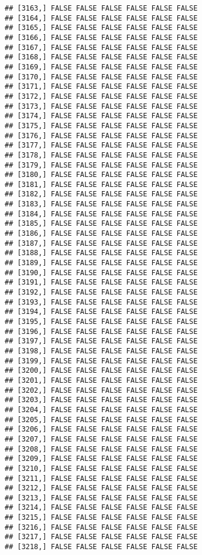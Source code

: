\documentclass[
]{article}
\begin{document}
\begin{verbatim}
## [3163,] FALSE FALSE FALSE FALSE FALSE FALSE
## [3164,] FALSE FALSE FALSE FALSE FALSE FALSE
## [3165,] FALSE FALSE FALSE FALSE FALSE FALSE
## [3166,] FALSE FALSE FALSE FALSE FALSE FALSE
## [3167,] FALSE FALSE FALSE FALSE FALSE FALSE
## [3168,] FALSE FALSE FALSE FALSE FALSE FALSE
## [3169,] FALSE FALSE FALSE FALSE FALSE FALSE
## [3170,] FALSE FALSE FALSE FALSE FALSE FALSE
## [3171,] FALSE FALSE FALSE FALSE FALSE FALSE
## [3172,] FALSE FALSE FALSE FALSE FALSE FALSE
## [3173,] FALSE FALSE FALSE FALSE FALSE FALSE
## [3174,] FALSE FALSE FALSE FALSE FALSE FALSE
## [3175,] FALSE FALSE FALSE FALSE FALSE FALSE
## [3176,] FALSE FALSE FALSE FALSE FALSE FALSE
## [3177,] FALSE FALSE FALSE FALSE FALSE FALSE
## [3178,] FALSE FALSE FALSE FALSE FALSE FALSE
## [3179,] FALSE FALSE FALSE FALSE FALSE FALSE
## [3180,] FALSE FALSE FALSE FALSE FALSE FALSE
## [3181,] FALSE FALSE FALSE FALSE FALSE FALSE
## [3182,] FALSE FALSE FALSE FALSE FALSE FALSE
## [3183,] FALSE FALSE FALSE FALSE FALSE FALSE
## [3184,] FALSE FALSE FALSE FALSE FALSE FALSE
## [3185,] FALSE FALSE FALSE FALSE FALSE FALSE
## [3186,] FALSE FALSE FALSE FALSE FALSE FALSE
## [3187,] FALSE FALSE FALSE FALSE FALSE FALSE
## [3188,] FALSE FALSE FALSE FALSE FALSE FALSE
## [3189,] FALSE FALSE FALSE FALSE FALSE FALSE
## [3190,] FALSE FALSE FALSE FALSE FALSE FALSE
## [3191,] FALSE FALSE FALSE FALSE FALSE FALSE
## [3192,] FALSE FALSE FALSE FALSE FALSE FALSE
## [3193,] FALSE FALSE FALSE FALSE FALSE FALSE
## [3194,] FALSE FALSE FALSE FALSE FALSE FALSE
## [3195,] FALSE FALSE FALSE FALSE FALSE FALSE
## [3196,] FALSE FALSE FALSE FALSE FALSE FALSE
## [3197,] FALSE FALSE FALSE FALSE FALSE FALSE
## [3198,] FALSE FALSE FALSE FALSE FALSE FALSE
## [3199,] FALSE FALSE FALSE FALSE FALSE FALSE
## [3200,] FALSE FALSE FALSE FALSE FALSE FALSE
## [3201,] FALSE FALSE FALSE FALSE FALSE FALSE
## [3202,] FALSE FALSE FALSE FALSE FALSE FALSE
## [3203,] FALSE FALSE FALSE FALSE FALSE FALSE
## [3204,] FALSE FALSE FALSE FALSE FALSE FALSE
## [3205,] FALSE FALSE FALSE FALSE FALSE FALSE
## [3206,] FALSE FALSE FALSE FALSE FALSE FALSE
## [3207,] FALSE FALSE FALSE FALSE FALSE FALSE
## [3208,] FALSE FALSE FALSE FALSE FALSE FALSE
## [3209,] FALSE FALSE FALSE FALSE FALSE FALSE
## [3210,] FALSE FALSE FALSE FALSE FALSE FALSE
## [3211,] FALSE FALSE FALSE FALSE FALSE FALSE
## [3212,] FALSE FALSE FALSE FALSE FALSE FALSE
## [3213,] FALSE FALSE FALSE FALSE FALSE FALSE
## [3214,] FALSE FALSE FALSE FALSE FALSE FALSE
## [3215,] FALSE FALSE FALSE FALSE FALSE FALSE
## [3216,] FALSE FALSE FALSE FALSE FALSE FALSE
## [3217,] FALSE FALSE FALSE FALSE FALSE FALSE
## [3218,] FALSE FALSE FALSE FALSE FALSE FALSE

\end{verbatim}
\end{document}

